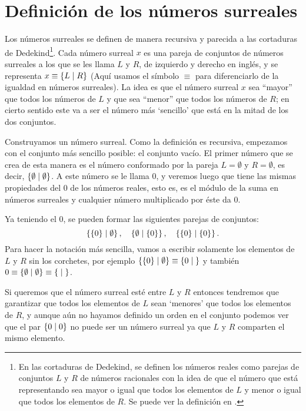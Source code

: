     
    
\section{Definici\'on de los n\'umeros surreales}

    Los números surreales se definen de manera recursiva y parecida a las cortaduras de Dedekind\footnote{En las cortaduras de Dedekind, se definen los n\'umeros reales como parejas de conjuntos $L$ y $R$ de n\'umeros racionales con la idea de que el n\'umero que est\'a representando sea mayor o igual que todos los elementos de $L$ y menor o igual que todos los elementos de $R$. Se puede ver la definici\'on en \cite{Dedekind1963-rt}.}. Cada n\'umero surreal $x$ es una pareja de conjuntos de n\'umeros surreales a los que se les llama $L$ y $R$, de izquierdo y derecho en ingl\'es, y se representa $x \equiv \left\{L\;\middle|\; R\right\}$ (Aqu\'i usamos el s\'imbolo $\equiv$ para diferenciarlo de la igualdad en n\'umeros surreales). La idea es que el n\'umero surreal $x$ sea ``mayor'' que todos los n\'umeros de $L$ y que sea ``menor'' que todos los n\'umeros de $R$; en cierto sentido este va a ser el n\'umero m\'as `sencillo' que est\'a en la mitad de los dos conjuntos.

    Construyamos un n\'umero surreal. Como la definici\'on es recursiva, empezamos con el conjunto m\'as sencillo posible: el conjunto vac\'io. El primer n\'umero que se crea de esta manera es el n\'umero conformado por la pareja $L = \emptyset$ y $R=\emptyset$, es decir, $\left\{\emptyset\;\middle|\; \emptyset\right\}$. A este n\'umero se le llama $0$, y veremos luego que tiene las mismas propiedades del $0$ de los n\'umeros reales, esto es, es el m\'odulo de la suma en n\'umeros surreales y cualquier n\'umero multiplicado por \'este da $0$.

    Ya teniendo el $0$, se pueden formar las siguientes parejas de conjuntos:
    \[
        \left\{\{0\}\;\middle|\; \emptyset\right\}, \quad \left\{\emptyset\;\middle|\; \{0\}\right\}, \quad \left\{\{0\}\;\middle|\; \{0\}\right\}.
    \]
    Para hacer la notaci\'on m\'as sencilla, vamos a escribir solamente los elementos de $L$ y $R$ sin los corchetes, por ejemplo $\left\{\{0\}\;\middle|\; \emptyset\right\} \equiv \left\{0\;\middle|\; \right\}$ y tambi\'en $0 \equiv \left\{\emptyset\;\middle|\; \emptyset\right\} \equiv \left\{\;\middle|\; \right\}$.

    Si queremos que el n\'umero surreal est\'e entre $L$ y $R$ entonces tendremos que garantizar que todos los elementos de $L$ sean `menores' que todos los elementos de $R$, y aunque a\'un no hayamos definido un orden en el conjunto podemos ver que el par $\left\{0\;\middle|\; 0\right\}$ no puede ser un n\'umero surreal ya que $L$ y $R$ comparten el mismo elemento.

